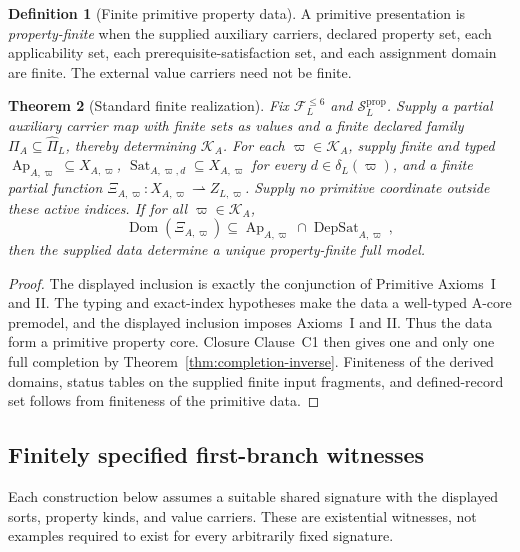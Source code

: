 \documentclass[11pt]{article}
\newcommand{\FVI}{\mathcal F_{L}^{\le 6}}
\newcommand{\Sprop}{\mathcal S_{L}^{\mathrm{prop}}}
\newcommand{\Pihat}{\widehat{\Pi}_{L}}
\newcommand{\Ap}{\operatorname{Ap}}
\newcommand{\DepSat}{\operatorname{DepSat}}
\newcommand{\Sat}{\operatorname{Sat}}
\newcommand{\Dom}{\operatorname{Dom}}
\newtheorem{theorem}{Theorem}[section]
\theoremstyle{definition}
\newtheorem{definition}[theorem]{Definition}
\theoremstyle{remark}
\begin{document}
\begin{definition}[Finite primitive property data]
A primitive presentation is \emph{property-finite} when the supplied auxiliary carriers, declared property set, each applicability set, each prerequisite-satisfaction set, and each assignment domain are finite.
The external value carriers need not be finite.
\end{definition}

\begin{theorem}[Standard finite realization]
\label{thm:finite-realization}
Fix \(\FVI\) and \(\Sprop\). Supply a partial auxiliary carrier map
with finite sets as values and a finite declared family
\(\Pi_A\subseteq\Pihat\), thereby determining \(\mathcal K_A\).
For each \(\varpi\in\mathcal K_A\), supply finite and typed
\(\Ap_{A,\varpi}\subseteq X_{A,\varpi}\),
\(\Sat_{A,\varpi,d}\subseteq X_{A,\varpi}\) for every
\(d\in\delta_L(\varpi)\), and a finite partial function
\(\Xi_{A,\varpi}:X_{A,\varpi}\rightharpoonup Z_{L,\varpi}\).
Supply no primitive coordinate outside these active indices.
If for all \(\varpi\in\mathcal K_A\),
\[
\Dom(\Xi_{A,\varpi})\subseteq
\Ap_{A,\varpi}\cap\DepSat_{A,\varpi},
\]
then the supplied data determine a unique property-finite full model.
\end{theorem}

\begin{proof}
The displayed inclusion is exactly the conjunction of Primitive Axioms~I and II.
The typing and exact-index hypotheses make the data a well-typed A-core premodel, and the displayed inclusion imposes Axioms~I and II. Thus the data form a primitive property core.
Closure Clause~C1 then gives one and only one full completion by Theorem~\ref{thm:completion-inverse}.
Finiteness of the derived domains, status tables on the supplied finite input fragments, and defined-record set follows from finiteness of the primitive data.
\end{proof}

\subsection{Finitely specified first-branch witnesses}

Each construction below assumes a suitable shared signature with
the displayed sorts, property kinds, and value carriers. These are
existential witnesses, not examples required to exist for every
arbitrarily fixed signature.
\end{document}
